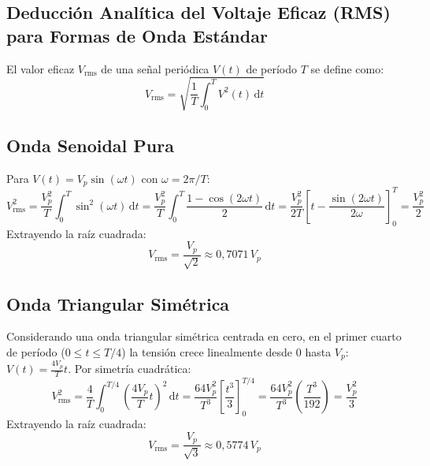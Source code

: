 
\begin{appendices}

\section{Deducción Analítica del Voltaje Eficaz (RMS) para Formas de Onda Estándar}
\label{anexo:deduccion_rms}

El valor eficaz $V_{\text{rms}}$ de una señal periódica $V(t)$ de período $T$ se define como:
\begin{equation}
    V_{\text{rms}} = \sqrt{\frac{1}{T} \int_0^T V^2(t)\,\mathrm{d}t} \label{eq:anexo_rms_def}
\end{equation}

\subsection{Onda Senoidal Pura}
Para $V(t) = V_p \sin(\omega t)$ con $\omega = 2\pi / T$:
\begin{equation}
    V_{\text{rms}}^2 = \frac{V_p^2}{T} \int_0^T \sin^2(\omega t)\,\mathrm{d}t = \frac{V_p^2}{T} \int_0^T \frac{1 - \cos(2\omega t)}{2}\,\mathrm{d}t = \frac{V_p^2}{2T} \left[ t - \frac{\sin(2\omega t)}{2\omega} \right]_0^T = \frac{V_p^2}{2}
\end{equation}
Extrayendo la raíz cuadrada:
\begin{equation}
    \boxed{V_{\text{rms}} = \frac{V_p}{\sqrt{2}} \approx 0{,}7071\,V_p} \label{eq:anexo_rms_seno}
\end{equation}

\subsection{Onda Triangular Simétrica}
Considerando una onda triangular simétrica centrada en cero, en el primer cuarto de período ($0 \le t \le T/4$) la tensión crece linealmente desde $0$ hasta $V_p$: $V(t) = \frac{4 V_p}{T} t$. Por simetría cuadrática:
\begin{equation}
    V_{\text{rms}}^2 = \frac{4}{T} \int_0^{T/4} \left(\frac{4 V_p}{T} t\right)^2\,\mathrm{d}t = \frac{64 V_p^2}{T^3} \left[ \frac{t^3}{3} \right]_0^{T/4} = \frac{64 V_p^2}{T^3} \left(\frac{T^3}{192}\right) = \frac{V_p^2}{3}
\end{equation}
Extrayendo la raíz cuadrada:
\begin{equation}
    \boxed{V_{\text{rms}} = \frac{V_p}{\sqrt{3}} \approx 0{,}5774\,V_p} \label{eq:anexo_rms_triang}
\end{equation}


\end{appendices}
